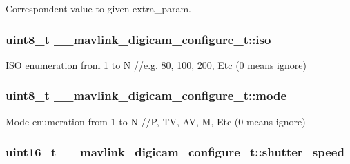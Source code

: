 Correspondent value to given extra\+\_\+param. 

\hypertarget{struct____mavlink__digicam__configure__t_ad5ff2d4748ae87e0f8e2a1ef450562bd}{
\subsubsection[{iso}]{\setlength{\rightskip}{0pt plus 5cm}uint8\+\_\+t \+\_\+\+\_\+mavlink\+\_\+digicam\+\_\+configure\+\_\+t\+::iso}}\label{struct____mavlink__digicam__configure__t_ad5ff2d4748ae87e0f8e2a1ef450562bd}


I\+S\+O enumeration from 1 to N //e.g. 80, 100, 200, Etc (0 means ignore) 

\hypertarget{struct____mavlink__digicam__configure__t_ae05b3c75132b340c8163f8211ae04302}{
\subsubsection[{mode}]{\setlength{\rightskip}{0pt plus 5cm}uint8\+\_\+t \+\_\+\+\_\+mavlink\+\_\+digicam\+\_\+configure\+\_\+t\+::mode}}\label{struct____mavlink__digicam__configure__t_ae05b3c75132b340c8163f8211ae04302}


Mode enumeration from 1 to N //\+P, T\+V, A\+V, M, Etc (0 means ignore) 

\hypertarget{struct____mavlink__digicam__configure__t_af76292aaf6b8c35b7573a4cbf7b4fdb0}{
\subsubsection[{shutter\+\_\+speed}]{\setlength{\rightskip}{0pt plus 5cm}uint16\+\_\+t \+\_\+\+\_\+mavlink\+\_\+digicam\+\_\+configure\+\_\+t\+::shutter\+\_\+speed}}\label{struct____mavlink__digicam__configure__t_af76292aaf6b8c35b7573a4cbf7b4fdb0}


